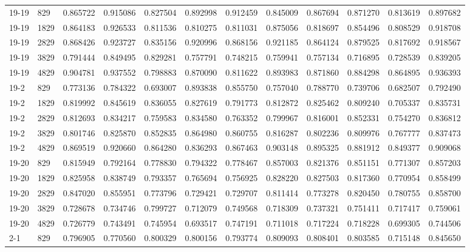 \begin{longtable}{llrrrrrrrrrr}
19-19 & 829 & 0.865722 & 0.915086 & 0.827504 & 0.892998 & 0.912459 & 0.845009 & 0.867694 & 0.871270 & 0.813619 & 0.897682\\
19-19 & 1829 & 0.864183 & 0.926533 & 0.811536 & 0.810275 & 0.811031 & 0.875056 & 0.818697 & 0.854496 & 0.808529 & 0.918708\\
19-19 & 2829 & 0.868426 & 0.923727 & 0.835156 & 0.920996 & 0.868156 & 0.921185 & 0.864124 & 0.879525 & 0.817692 & 0.918567\\
19-19 & 3829 & 0.791444 & 0.849495 & 0.829281 & 0.757791 & 0.748215 & 0.759941 & 0.757134 & 0.716895 & 0.728539 & 0.839205\\
19-19 & 4829 & 0.904781 & 0.937552 & 0.798883 & 0.870090 & 0.811622 & 0.893983 & 0.871860 & 0.884298 & 0.864895 & 0.936393\\
19-2 & 829 & 0.773136 & 0.784322 & 0.693007 & 0.893838 & 0.855750 & 0.757040 & 0.788770 & 0.739706 & 0.682507 & 0.792490\\
19-2 & 1829 & 0.819992 & 0.845619 & 0.836055 & 0.827619 & 0.791773 & 0.812872 & 0.825462 & 0.809240 & 0.705337 & 0.835731\\
19-2 & 2829 & 0.812693 & 0.834217 & 0.759583 & 0.834580 & 0.763352 & 0.799967 & 0.816001 & 0.852331 & 0.754270 & 0.836812\\
19-2 & 3829 & 0.801746 & 0.825870 & 0.852835 & 0.864980 & 0.860755 & 0.816287 & 0.802236 & 0.809976 & 0.767777 & 0.837473\\
19-2 & 4829 & 0.869519 & 0.920660 & 0.864280 & 0.836293 & 0.867463 & 0.903148 & 0.895325 & 0.881912 & 0.849377 & 0.909068\\
19-20 & 829 & 0.815949 & 0.792164 & 0.778830 & 0.794322 & 0.778467 & 0.857003 & 0.821376 & 0.851151 & 0.771307 & 0.857203\\
19-20 & 1829 & 0.825958 & 0.838749 & 0.793357 & 0.765694 & 0.756925 & 0.828220 & 0.827503 & 0.817360 & 0.770954 & 0.858499\\
19-20 & 2829 & 0.847020 & 0.855951 & 0.773796 & 0.729421 & 0.729707 & 0.811414 & 0.773278 & 0.820450 & 0.780755 & 0.858700\\
19-20 & 3829 & 0.728678 & 0.734746 & 0.799727 & 0.712079 & 0.749568 & 0.718309 & 0.737321 & 0.751411 & 0.717417 & 0.759061\\
19-20 & 4829 & 0.726779 & 0.743491 & 0.745954 & 0.693517 & 0.747191 & 0.711018 & 0.717224 & 0.718228 & 0.699305 & 0.744506\\
2-1 & 829 & 0.796905 & 0.770560 & 0.800329 & 0.800156 & 0.793774 & 0.809093 & 0.808401 & 0.803585 & 0.715148 & 0.845650\\

\end{longtable}

